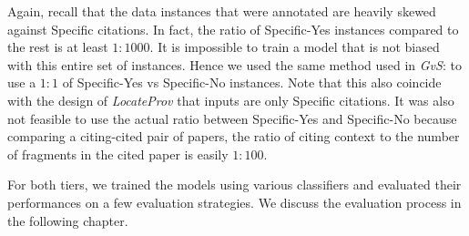 Again, recall that the data instances that were annotated are heavily skewed against Specific citations. In fact, the ratio of Specific-Yes instances compared to the rest is at least $1:1000$. It is impossible to train a model that is not biased with this entire set of instances. Hence we used the same method used in {\it GvS}: to use a $1:1$ of Specific-Yes vs Specific-No instances. Note that this also coincide with the design of {\it LocateProv} that inputs are only Specific citations. It was also not feasible to use the actual ratio between Specific-Yes and Specific-No because comparing a citing-cited pair of papers, the ratio of citing context to the number of fragments in the cited paper is easily $1:100$.

For both tiers, we trained the models using various classifiers and evaluated their performances on a few evaluation strategies. We discuss the evaluation process in the following chapter.